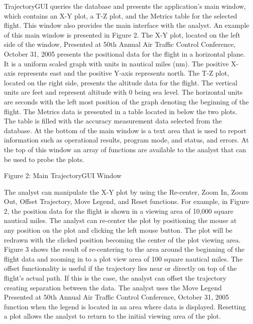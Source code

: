 \documentclass[]{article}
\begin{document}
TrajectoryGUI queries the database and presents the application’s main window, which contains an X-Y plot, a T-Z plot, and the Metrics table for the selected flight. This window also provides the main interface with the analyst. An example of this main window is presented in Figure 2. The X-Y plot, located on the left side of the window, Presented at 50th Annual Air Traffic Control Conference, October 31, 2005 presents the positional data for the flight in a horizontal plane. It is a uniform scaled graph with units in nautical miles (nm). The positive X-axis represents east and the positive Y-axis represents north. The T-Z plot, located on the right side, presents the altitude data for the flight. The vertical units are feet and represent altitude with 0 being sea level. The horizontal units are seconds with the left most position of the graph denoting the beginning of the flight. The Metrics data is presented in a table located in below the two plots. The table is filled with the accuracy measurement data selected from the database. At the bottom of the main window is a text area that is used to report information such as operational results, program mode, and status, and errors. At the top of this window an array of functions are available to the analyst that can be used to probe the plots.

Figure 2: Main TrajectoryGUI Window

The analyst can manipulate the X-Y plot by using the Re-center, Zoom In, Zoom Out, Offset Trajectory, Move Legend, and Reset functions. For example, in Figure 2, the position data for the flight is shown in a viewing area of 10,000 square nautical miles. The analyst can re-center the plot by positioning the mouse at any position on the plot and clicking the left mouse button. The plot will be redrawn with the clicked position becoming the center of the plot viewing area. Figure 3 shows the result of re-centering to the area around the beginning of the flight data and zooming in to a plot view area of 100 square nautical miles. The offset functionality is useful if the trajectory lies near or directly on top of the flight’s actual path. If this is the case, the analyst can offset the trajectory creating separation between the data. The analyst uses the Move Legend Presented at 50th Annual Air Traffic Control Conference, October 31, 2005 function when the legend is located in an area where data is displayed. Resetting a plot allows the analyst to return to the initial viewing area of the plot.
\end{document}
